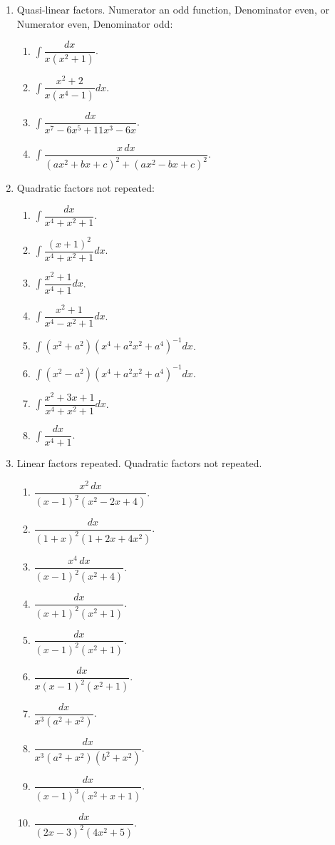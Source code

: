 \documentclass[11pt, a4paper]{article}
\begin{document}
\begin{enumerate}[leftmargin=2em]
\item Quasi-linear factors. Numerator an odd function, Denominator even, or Numerator even, Denominator odd:
\begin{enumerate}[label=(\roman*)]
\item $\displaystyle\int \dfrac{dx}{x(x^2+1)}$.
\item $\displaystyle\int \dfrac{x^2+2}{x(x^4-1)}dx$.
\item $\displaystyle\int \dfrac{dx}{x^7-6x^5+11x^3-6x}$.
\item $\displaystyle\int \dfrac{x\,dx}{(ax^2+bx+c)^2+(ax^2-bx+c)^2}$.
\end{enumerate}

\item Quadratic factors not repeated:
\begin{enumerate}[label=(\roman*)]
\item $\displaystyle\int \dfrac{dx}{x^4+x^2+1}$.
\item $\displaystyle\int \dfrac{(x+1)^2}{x^4+x^2+1}dx$.
\item $\displaystyle\int \dfrac{x^2+1}{x^4+1}dx$.
\item $\displaystyle\int \dfrac{x^2+1}{x^4-x^2+1}dx$.
\item $\displaystyle\int (x^2+a^2)(x^4+a^2x^2+a^4)^{-1}dx$.
\item $\displaystyle\int (x^2-a^2)(x^4+a^2x^2+a^4)^{-1}dx$.
\item $\displaystyle\int \dfrac{x^2+3x+1}{x^4+x^2+1}dx$.
\item $\displaystyle\int \dfrac{dx}{x^4+1}$.
\end{enumerate}

\item Linear factors repeated. Quadratic factors not repeated.
\begin{enumerate}[label=(\roman*)]
\item $\dfrac{x^2\,dx}{(x-1)^2(x^2-2x+4)}$.
\item $\dfrac{dx}{(1+x)^2(1+2x+4x^2)}$.
\item $\dfrac{x^4\,dx}{(x-1)^2(x^2+4)}$.
\item $\dfrac{dx}{(x+1)^2(x^2+1)}$.
\item $\dfrac{dx}{(x-1)^2(x^2+1)}$.
\item $\dfrac{dx}{x(x-1)^2(x^2+1)}$.
\item $\dfrac{dx}{x^3(a^2+x^2)}$.
\item $\dfrac{dx}{x^3(a^2+x^2)(b^2+x^2)}$.
\item $\dfrac{dx}{(x-1)^3(x^2+x+1)}$.
\item $\dfrac{dx}{(2x-3)^2(4x^2+5)}$.
\end{enumerate}


\end{enumerate}
\end{document}
